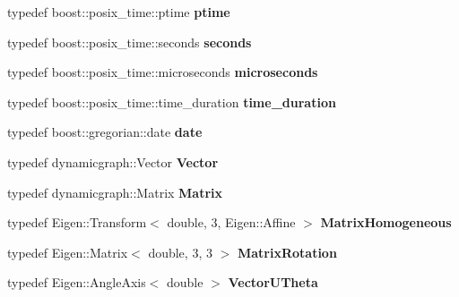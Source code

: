 \begin{DoxyCompactItemize}
typedef boost\+::posix\+\_\+time\+::ptime {\bfseries ptime}
\item 
\mbox{\label{namespacedynamic__graph_a6b06a10863ed1b2411191a895621dbb0}} 
typedef boost\+::posix\+\_\+time\+::seconds {\bfseries seconds}
\item 
\mbox{\label{namespacedynamic__graph_a4244ef24ba8efe2112a5535fd562e8b4}} 
typedef boost\+::posix\+\_\+time\+::microseconds {\bfseries microseconds}
\item 
\mbox{\label{namespacedynamic__graph_a4be0df79b9608a71968778c85d4a5f25}} 
typedef boost\+::posix\+\_\+time\+::time\+\_\+duration {\bfseries time\+\_\+duration}
\item 
\mbox{\label{namespacedynamic__graph_a1a7a95fd96c4e7f1b829260880f14d91}} 
typedef boost\+::gregorian\+::date {\bfseries date}
\item 
\mbox{\label{namespacedynamic__graph_a2df237966b015fea47c58c7778cc9a73}} 
typedef dynamicgraph\+::\+Vector {\bfseries Vector}
\item 
\mbox{\label{namespacedynamic__graph_a58a622fc51830acb132d3a3f18115374}} 
typedef dynamicgraph\+::\+Matrix {\bfseries Matrix}
\item 
\mbox{\label{namespacedynamic__graph_a1cf832cafc093c1600db8cc4436661bb}} 
typedef Eigen\+::\+Transform$<$ double, 3, Eigen\+::\+Affine $>$ {\bfseries Matrix\+Homogeneous}
\item 
\mbox{\label{namespacedynamic__graph_a50d1b342105103d3078687b78d5e8197}} 
typedef Eigen\+::\+Matrix$<$ double, 3, 3 $>$ {\bfseries Matrix\+Rotation}
\item 
\mbox{\label{namespacedynamic__graph_aabaea0c174dde41c755e8d3fb6d23caa}} 
typedef Eigen\+::\+Angle\+Axis$<$ double $>$ {\bfseries Vector\+U\+Theta}
\item 
\mbox{\label{namespacedynamic__graph_a9f22f1c9369a98e94778717faeec3f4b}} 

\end{DoxyCompactItemize}
